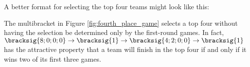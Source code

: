 {    A better format for selecting the top four teams might look like this:


    The multibracket in Figure \ref{fig:fourth_place_game} selects a top four without having the selection be determined only by the first-round games. In fact, $\bracksig{8;0;0;0} \to \bracksig{1} \to \bracksig{4; 2; 0; 0} \to \bracksig{1}$ has the attractive property that a team will finish in the top four if and only if it wins two of its first three games.
}